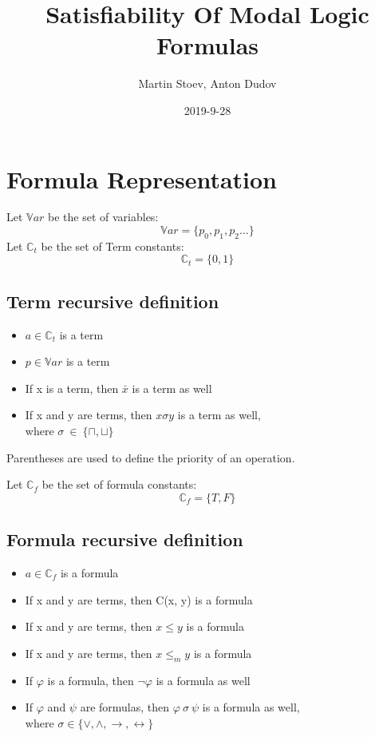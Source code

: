 \documentclass{article}
\title{Satisfiability Of Modal Logic Formulas}
\date{2019-9-28}
\author{Martin Stoev, Anton Dudov}
\begin{document}
	\maketitle
	\newpage

	\section{Formula Representation}
	Let $\mathbb{V}ar$ be the set of variables:
	\[ \mathbb{V}ar = \{p_0, p_1, p_2 ... \}\]
	Let $\mathbb{C}_t$ be the set of Term constants:
	\[ \mathbb{C}_t = \{0, 1 \}\]
	\subsection{Term recursive definition}
	\begin{itemize}
		\item $a \in \mathbb{C}_t$ is a term
		\item $p \in \mathbb{V}ar$ is a term
		\item If x is a term, then $\bar{x}$ is a term as well
		\item If x and y are terms, then $x \sigma y $ is a term as well,\\
			where $\sigma \: \in \: \{\sqcap, \sqcup\}$
	\end{itemize}
	Parentheses are used to define the priority of an operation.

	Let $\mathbb{C}_f$ be the set of formula constants:
	\[ \mathbb{C}_f = \{T, F \}\]
	\subsection{Formula recursive definition}
	\begin{itemize}
		\item $a \in \mathbb{C}_f$ is a formula
		\item If x and y are terms, then C(x, y) is a formula
		\item If x and y are terms, then $x \le y$ is a formula
		\item If x and y are terms, then $x \le_m y$ is a formula
		\item If $\varphi$ is a formula, then $\neg \varphi$ is a formula as well
		\item If $\varphi$ and $\psi$ are formulas, then $\varphi \: \sigma \: \psi $ is a formula as well,\\
			where $\sigma \in \{\vee, \wedge, \rightarrow, \leftrightarrow\}$
	\end{itemize}
\end{document}
